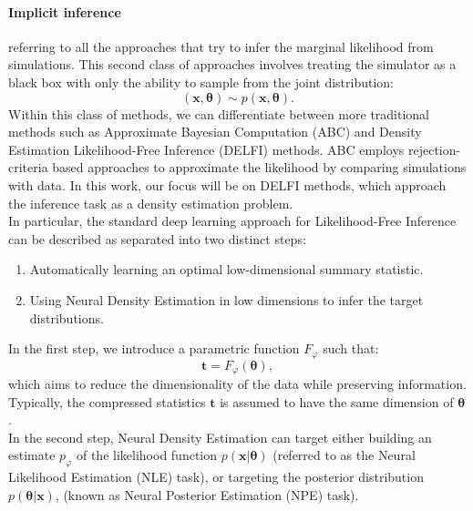 \documentclass{aa}
\begin{document}
\paragraph{\textbf{Implicit inference}} referring to all the approaches that try to infer the marginal likelihood from simulations. This second class of approaches involves treating the simulator as a black box with only the ability to sample from the joint distribution:
\begin{equation}
    (\bm{x}, \bm{\theta})\sim p(\bm{x}, \bm{\theta}).
\end{equation}
Within this class of methods, we can differentiate between more traditional methods such as Approximate Bayesian Computation (ABC) and Density Estimation Likelihood-Free Inference (DELFI) methods. ABC employs rejection-criteria based approaches to approximate the likelihood by comparing simulations with data. 
In this work, our focus will be on DELFI methods, which approach the inference task as a density estimation problem. \\
In particular, the standard deep learning approach for Likelihood-Free Inference can be described as separated into two distinct steps:
\begin{enumerate}
    \item  Automatically learning an optimal low-dimensional summary statistic.
    \item Using Neural Density Estimation in low dimensions to infer the target distributions.
\end{enumerate}
In the first step, we introduce a parametric function $F_{\varphi}$ such that:
     \begin{equation}
         \bm{t}=F_{\varphi}(\bm{\theta}),
     \end{equation}
which aims to reduce the dimensionality of the data while preserving information. Typically, the compressed statistics $\bm{t}$ is assumed to have the same dimension of $\bm{\theta}$. \\
In the second step, Neural Density Estimation can target either building an estimate $p_{\varphi}$ of the likelihood function $p(\bm{x}|\bm{\theta})$ (referred to as the Neural Likelihood Estimation (NLE) task), or targeting the posterior distribution $p(\bm{\theta}|\bm{x})$, (known as Neural Posterior Estimation (NPE) task). 
\end{document}
